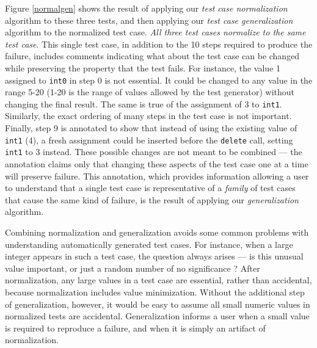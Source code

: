 Figure \ref{normalgen} shows the result of applying our \emph{test case
  normalization} algorithm to these three tests, and then applying our
\emph{test case generalization} algorithm to the normalized test case.
\emph{All three test cases normalize to the same test
case}.  This single test case, in addition to the 10 steps required to produce
the failure, includes comments indicating what about the test case can
be changed while preserving the property that the test fails.  For instance, the
value 1 assigned to {\tt int0} in step 0 is not essential.  It could
be changed to any value in the range 5-20 (1-20 is the range of values
allowed by the test generator) without changing the final result.  The
same is true of the assignment of 3 to {\tt int1}.  Similarly, the
exact ordering of many steps in the test case is not important.  Finally,
step 9 is annotated to show that instead of using the existing value
of {\tt int1} (4), a fresh assignment could be inserted before the
{\tt delete} call, setting {\tt
  int1} to 3 instead.  These possible
changes are not meant to be combined --- the annotation claims only
that changing these aspects of the test case one at a time will
preserve failure.  This annotation,
which provides information
allowing a user to understand that a single test case is
representative of a \emph{family} of test cases that cause the same
kind of failure, is the result of applying our \emph{generalization}
\cite{SmartCheck} algorithm.

Combining normalization and generalization avoids some common problems
with understanding automatically generated test cases.  For instance,
when a large integer appears in such a test case, the question always
arises --- is this unusual value important, or just a random number of
no significance \cite{MakeMost}?  After normalization, any large
values in a test case are essential, rather than
accidental, because normalization includes value minimization.
Without the additional step of generalization, however, it would be
easy to assume all small numeric values in normalized
tests are accidental.  Generalization informs a user when a small
value is required to reproduce a failure, and when it is simply an
artifact of normalization.

